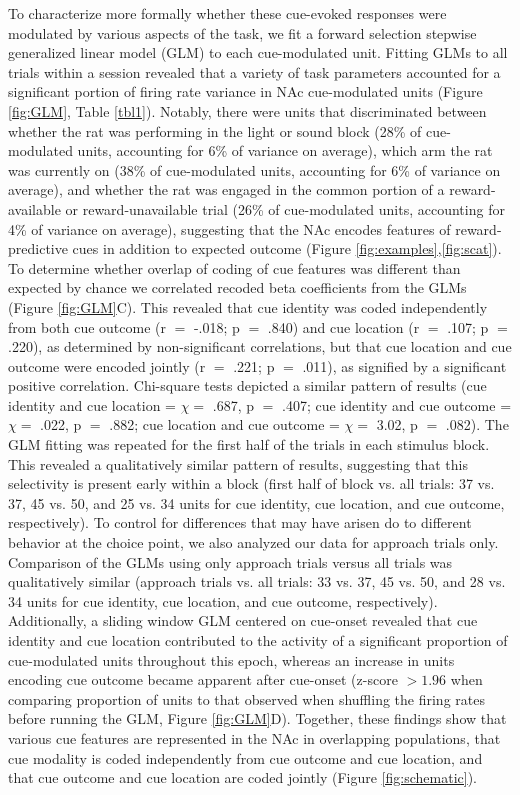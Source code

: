 \documentclass[11pt]{article}
\begin{document}
To characterize more formally whether these cue-evoked responses were modulated by various aspects of the task, we fit a forward selection stepwise generalized linear model (GLM) to each cue-modulated unit. Fitting GLMs to all trials within a session revealed that a variety of task parameters accounted for a significant portion of firing rate variance in NAc cue-modulated units (Figure \ref{fig:GLM}, Table \ref{tbl1}). Notably, there were units that discriminated between whether the rat was performing in the light or sound block (28\% of cue-modulated units, accounting for 6\% of variance on average), which arm the rat was currently on (38\% of cue-modulated units, accounting for 6\% of variance on average), and whether the rat was engaged in the common portion of a reward-available or reward-unavailable trial (26\% of cue-modulated units, accounting for 4\% of variance on average), suggesting that the NAc encodes features of reward-predictive cues in addition to expected outcome (Figure \ref{fig:examples},\ref{fig:scat}). To determine whether overlap of coding of cue features was different than expected by chance we correlated recoded beta coefficients from the GLMs (Figure \ref{fig:GLM}C). This revealed that cue identity was coded independently from both cue outcome (r $=$ -.018; p $=$ .840) and cue location (r $=$ .107; p $=$ .220), as determined by non-significant correlations, but that cue location and cue outcome were encoded jointly (r $=$ .221; p $=$ .011), as signified by a significant positive correlation. Chi-square tests depicted a similar pattern of results (cue identity and cue location = $\chi =$ .687, p $=$ .407; cue identity and cue outcome = $\chi =$ .022, p $=$ .882; cue location and cue outcome = $\chi =$ 3.02, p $=$ .082). The GLM fitting was repeated for the first half of the trials in each stimulus block. This revealed a qualitatively similar pattern of results, suggesting that this selectivity is present early within a block (first half of block vs. all trials: 37 vs. 37, 45 vs. 50, and 25 vs. 34 units for cue identity, cue location, and cue outcome, respectively). To control for differences that may have arisen do to different behavior at the choice point, we also analyzed our data for approach trials only. Comparison of the GLMs using only approach trials versus all trials was qualitatively similar (approach trials vs. all trials: 33 vs. 37, 45 vs. 50, and 28 vs. 34 units for cue identity, cue location, and cue outcome, respectively).  Additionally, a sliding window GLM centered on cue-onset revealed that cue identity and cue location contributed to the activity of a significant proportion of cue-modulated units throughout this epoch, whereas an increase in units encoding cue outcome became apparent after cue-onset (z-score $>1.96$ when comparing proportion of units to that observed when shuffling the firing rates before running the GLM, Figure \ref{fig:GLM}D). Together, these findings show that various cue features are represented in the NAc in overlapping populations, that cue modality is coded independently from cue outcome and cue location, and that cue outcome and cue location are coded jointly (Figure \ref{fig:schematic}).
\end{document}
